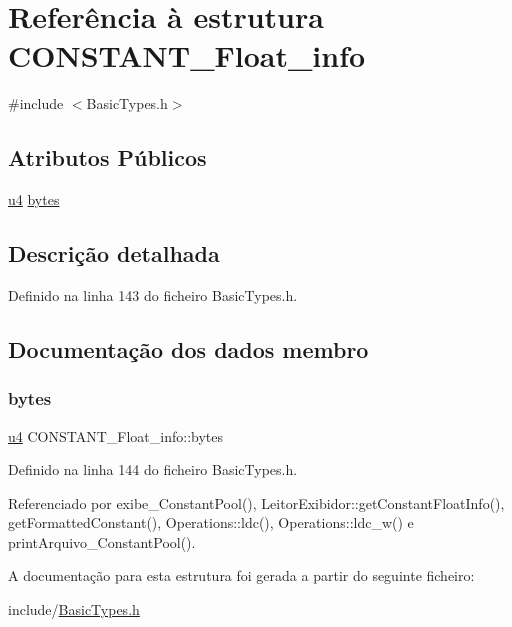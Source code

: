 \hypertarget{structCONSTANT__Float__info}{}\section{Referência à estrutura C\+O\+N\+S\+T\+A\+N\+T\+\_\+\+Float\+\_\+info}
\label{structCONSTANT__Float__info}


{\ttfamily \#include $<$Basic\+Types.\+h$>$}

\subsection*{Atributos Públicos}
\begin{DoxyCompactItemize}
\item 
\hyperlink{BasicTypes_8h_ae5be1f726785414dd1b77d60df074c9d}{u4} \hyperlink{structCONSTANT__Float__info_a9ebd8fbd25f329288cbe934c889de72e}{bytes}
\end{DoxyCompactItemize}


\subsection{Descrição detalhada}


Definido na linha 143 do ficheiro Basic\+Types.\+h.



\subsection{Documentação dos dados membro}
\mbox{\label{structCONSTANT__Float__info_a9ebd8fbd25f329288cbe934c889de72e}} 
\subsubsection{\texorpdfstring{bytes}{bytes}}
{\footnotesize\ttfamily \hyperlink{BasicTypes_8h_ae5be1f726785414dd1b77d60df074c9d}{u4} C\+O\+N\+S\+T\+A\+N\+T\+\_\+\+Float\+\_\+info\+::bytes}



Definido na linha 144 do ficheiro Basic\+Types.\+h.



Referenciado por exibe\+\_\+\+Constant\+Pool(), Leitor\+Exibidor\+::get\+Constant\+Float\+Info(), get\+Formatted\+Constant(), Operations\+::ldc(), Operations\+::ldc\+\_\+w() e print\+Arquivo\+\_\+\+Constant\+Pool().



A documentação para esta estrutura foi gerada a partir do seguinte ficheiro\+:\begin{DoxyCompactItemize}
\item 
include/\hyperlink{BasicTypes_8h}{Basic\+Types.\+h}\end{DoxyCompactItemize}

